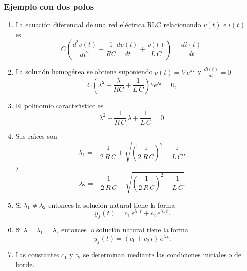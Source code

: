 \subsubsection{Ejemplo con dos polos}

\begin{enumerate}
	\item La ecuaci\'{o}n diferencial de una red el\'{e}ctrica RLC relacionando $v\left(t\right) $ e $i\left( t\right) $ es 
	\begin{equation}
		C\left( \frac{d^{2} v\left( t\right) }{dt^{2}}+
		\frac{1}{RC}\frac{dv\left( t\right) }{dt}+
		\frac{v\left( t\right) }{L \, C} \right) =
		\frac{di\left( t\right) }{dt}.
	\end{equation}
	
	\item La soluci\'{o}n homog\'{e}nea se obtiene suponiendo $v(t) = V \, e^{\lambda \, t}$ y $\frac{di\left( t\right) }{dt} = 0$
	\begin{equation}
		C\left( \lambda^{2} + \frac{\lambda}{RC} + \frac{1}{L \, C} \right) V e^{\lambda t} = 0,
	\end{equation}
	
	\item El polinomio caracter\'{\i}stico es 
	\begin{equation}
		\lambda ^{2}+\frac{1}{R \, C} \, \lambda +\frac{1}{L \, C} = 0.
	\end{equation}
	
	\item Sus ra\'{\i}ces son 
	\begin{equation}
		\lambda_{1}=-\frac{1}{2 \, R \, C}+\sqrt{\left( \frac{1}{2 \, R \, C}\right) ^{2}-\frac{1}{L \, C}},
	\end{equation}
	y 
	\begin{equation}
		\lambda_{2}=-\frac{1}{2 \, R \, C}-\sqrt{\left( \frac{1}{2 \, R \, C}\right) ^{2}-\frac{1}{L \, C}}.
	\end{equation}
	
	\item Si $\lambda_{1} \neq \lambda_{2}$ entonces la soluci\'{o}n natural tiene la forma
	\begin{equation}
		y_{f}\left( t\right) = c_{1} \, e^{\lambda_{1} \, t} + c_{2} \, e^{\lambda_{2} \, t}.
	\end{equation}
	
	\item Si $\lambda = \lambda_{1} = \lambda_{2}$ entonces la soluci\'{o}n natural tiene la forma
	\begin{equation}
		y_{f}\left( t\right) = (c_{1} + c_{2} \, t) \, e^{\lambda \, t}.
	\end{equation}
	
	\item Las constantes $c_{1}$ y $c_{2}$ se determinan mediante las condiciones iniciales o de borde.
\end{enumerate}

